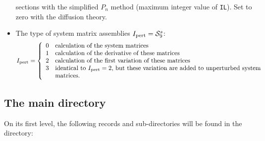 \begin{itemize}
sections with the simplified $P_n$ method (maximum integer value of {\tt IL}). Set to zero with the diffusion theory.
\item The type of system matrix assemblies $I_{\rm pert}=\mathcal{S}^{s}_{9}$:
\begin{displaymath}
I_{\rm pert} = \left\{
\begin{array}{ll}
0 & \textrm{calculation of the system matrices}\\
1 & \textrm{calculation of the derivative of these matrices}\\
2 & \textrm{calculation of the first variation of these matrices}\\
3 & \textrm{identical to $I_{\rm pert}=2$, but these variation are added to unperturbed system}\\
  & \textrm{matrices.}
\end{array} \right.
\end{displaymath}
\end{itemize}
\goodbreak

\subsection{The main  directory}\label{sect:systemdirmain}

On its first level, the
following records and sub-directories will be found in the  directory:

